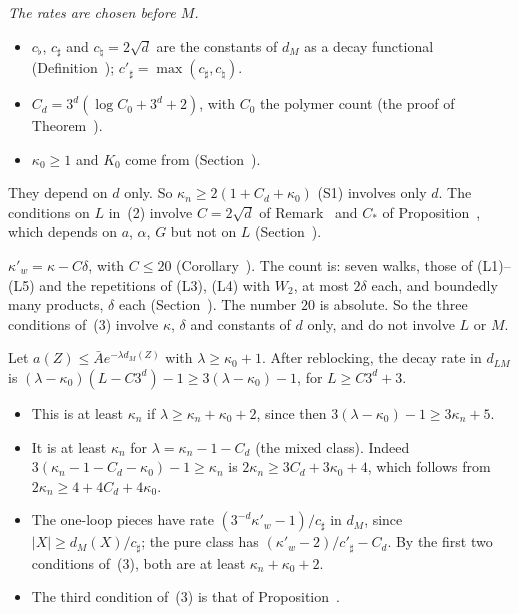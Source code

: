 \begin{detail}\label{det:ledger-rates}
\emph{The rates are chosen before $M$.}

\begin{step}
\begin{itemize}
\item $c_\flat$, $c_\sharp$ and $c_\natural=2\sqrt d$ are the constants of $d_M$ as a decay functional (Definition~); $c'_\sharp=\max(c_\sharp,c_\natural)$.
\item $C_d=3^d(\log C_0+3^d+2)$, with $C_0$ the polymer count (the proof of Theorem~).
\item $\kappa_0\ge1$ and $K_0$ come from  (Section~).
\end{itemize}
They depend on $d$ only. So $\kappa_n\ge2(1+C_d+\kappa_0)$ (S1) involves only $d$. The conditions on $L$ in~(2) involve $C=2\sqrt d$ of Remark~ and $C_*$ of Proposition~, which depends on $a$, $\alpha$, $G$ but not on $L$ (Section~).
\end{step}

\begin{step}\label{det:ledger-rates-loss}
$\kappa'_w=\kappa-C\delta$, with $C\le20$ (Corollary~). The count is: seven walks, those of (L1)--(L5) and the repetitions of (L3), (L4) with $W_2$, at most $2\delta$ each, and boundedly many products, $\delta$ each (Section~). The number $20$ is absolute. So the three conditions of~(3) involve $\kappa$, $\delta$ and constants of $d$ only, and do not involve $L$ or $M$.
\end{step}

\begin{step}
Let $a(Z)\le\bar Ae^{-\lambda d_M(Z)}$ with $\lambda\ge\kappa_0+1$. After reblocking, the decay rate in $d_{LM}$ is $(\lambda-\kappa_0)(L-C3^d)-1\ge3(\lambda-\kappa_0)-1$, for $L\ge C3^d+3$.
\begin{itemize}
\item This is at least $\kappa_n$ if $\lambda\ge\kappa_n+\kappa_0+2$, since then $3(\lambda-\kappa_0)-1\ge3\kappa_n+5$.
\item It is at least $\kappa_n$ for $\lambda=\kappa_n-1-C_d$ (the mixed class). Indeed $3(\kappa_n-1-C_d-\kappa_0)-1\ge\kappa_n$ is $2\kappa_n\ge3C_d+3\kappa_0+4$, which follows from $2\kappa_n\ge4+4C_d+4\kappa_0$.
\item The one-loop pieces have rate $(3^{-d}\kappa'_w-1)/c_\sharp$ in $d_M$, since $|X|\ge d_M(X)/c_\sharp$; the pure class has $(\kappa'_w-2)/c'_\sharp-C_d$. By the first two conditions of~(3), both are at least $\kappa_n+\kappa_0+2$.
\item The third condition of~(3) is that of Proposition~.
\end{itemize}
\end{step}


\end{detail}
